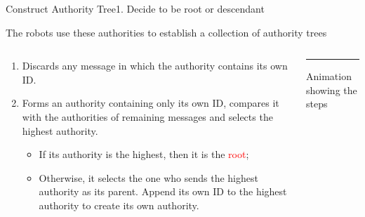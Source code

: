 \documentclass[10pt]{beamer}
\begin{document}
\begin{frame}{Construct Authority Tree}{1. Decide to be root or descendant}
  \begin{block}{The robots use these authorities to establish a collection of
  authority trees}
  \begin{columns}[T] %
    \begin{column}{.55\textwidth}
        \begin{enumerate}
        \item Discards any message in which the authority contains its
          own ID.
        \item Forms an authority containing only its own ID,
          compares it with the authorities of remaining messages and
          selects the highest authority.
          \begin{itemize}
          \item If its authority is the highest, then it is
            the \textcolor{red}{root};
          \item Otherwise, it selects the one who sends the highest
            authority as its parent. Append its own ID to the highest
            authority to create its own authority. 
          \end{itemize} 
        \end{enumerate} 
    \end{column}%
    \begin{column}{.45\textwidth}
      \color{blue}\rule{\linewidth}{4pt}

      Animation showing the steps
    \end{column}%
  \end{columns}
\end{block}
\end{frame}
\end{document}
